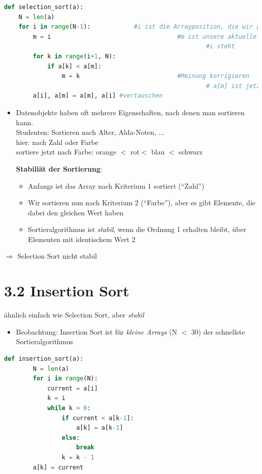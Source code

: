 \documentclass[11pt, fleqn]{scrreprt}
\begin{document}
			\begin{lstlisting}[language=Python]
def selection_sort(a):
	N = len(a)
	for i in range(N-1):			#i ist die Arrayposition, die wir gerade sortieren wollen
		m = i 									#m ist unsere aktuelle Meinung, wo das kleinste rechts von 
														#i steht
		for k in range(i+1, N):
			if a[k] < a[m]:
				m = k 							#Meinung korrigieren
														# a[m] ist jetzt das kleinste Element rechts von i
  		a[i], a[m] = a[m], a[i] #vertauschen
			\end{lstlisting}
			\begin{itemize}
				\item Datenobjekte haben oft mehrere Eigenschaften, nach denen man sortieren kann. \\
				Studenten: Sortieren nach Alter, Alda-Noten, ... \\
				hier: nach Zahl oder Farbe\\
				sortiere jetzt nach Farbe: orange $<$ rot$ <$ blau $<$ schwarz
				
				\textbf{Stabiliät der Sortierung}:
				\begin{itemize}
					\item Anfangs ist das Array nach Kriterium 1 sortiert (``Zahl'')
					\item Wir sortieren nun nach Kriterium 2 (``Farbe''), aber es gibt Elemente, die dabei den gleichen Wert haben
					\item Sortieralgorithmus ist \emph{stabil}, wenn die Ordnung 1 erhalten bleibt, über Elementen mit identischem Wert 2
				\end{itemize}
			\end{itemize}
			$\Rightarrow$ Selection Sort nicht stabil \\
			
			\section*{3.2 Insertion Sort}
			ähnlich einfach wie Selection Sort, aber \emph{stabil}
			\begin{itemize}
				\item Beobachtung: Insertion Sort ist für \emph{kleine Arrays} (N $<$ 30) der schnellste Sortieralgorithmus \\
			\end{itemize}
			\begin{lstlisting}[language=Python]
	def insertion_sort(a):
		N = len(a)
		for i in range(N):
			current = a[i]
			k = i
			while k > 0:
				if current < a[k-1]:
					a[k] = a[k-1]
				else:
					break
				k = k - 1
		a[k] = current
			\end{lstlisting}
			
\end{document}
